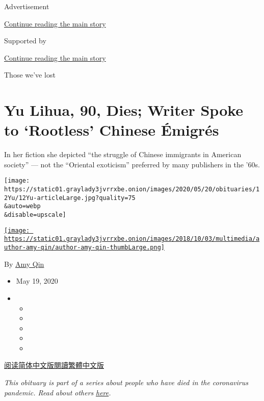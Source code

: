 Advertisement

\protect\hyperlink{after-top}{Continue reading the main story}

Supported by

\protect\hyperlink{after-sponsor}{Continue reading the main story}

Those we've lost

\hypertarget{yu-lihua-90-dies-writer-spoke-to-rootless-chinese-uxe9migruxe9s}{%
\section{Yu Lihua, 90, Dies; Writer Spoke to `Rootless' Chinese
Émigrés}\label{yu-lihua-90-dies-writer-spoke-to-rootless-chinese-uxe9migruxe9s}}

In her fiction she depicted ``the struggle of Chinese immigrants in
American society'' --- not the ``Oriental exoticism'' preferred by many
publishers in the '60s.

\texttt{[image: https://static01.graylady3jvrrxbe.onion/images/2020/05/20/obituaries/12Yu/12Yu-articleLarge.jpg?quality=75\\\&auto=webp\\\&disable=upscale]}

\href{https://www.nytimes3xbfgragh.onion/by/amy-qin}{\texttt{[image: https://static01.graylady3jvrrxbe.onion/images/2018/10/03/multimedia/author-amy-qin/author-amy-qin-thumbLarge.png]}}

By \href{https://www.nytimes3xbfgragh.onion/by/amy-qin}{Amy Qin}

\begin{itemize}
\item
  May 19, 2020
\item
  \begin{itemize}
  \item
  \item
  \item
  \item
  \item
  \end{itemize}
\end{itemize}

\href{https://cn.nytimes3xbfgragh.onion/obits/20200520/yu-lihua-90-dies-writer-spoke-to-rootless-chinese-emigres/}{阅读简体中文版}\href{https://cn.nytimes3xbfgragh.onion/obits/20200520/yu-lihua-90-dies-writer-spoke-to-rootless-chinese-emigres/zh-hant}{閱讀繁體中文版}

\emph{This obituary is part of a series about people who have died in
the coronavirus pandemic. Read about others}
\href{https://www.nytimes3xbfgragh.onion/series/people-who-have-died-of-the-coronavirus}{\emph{here}}\emph{.}

